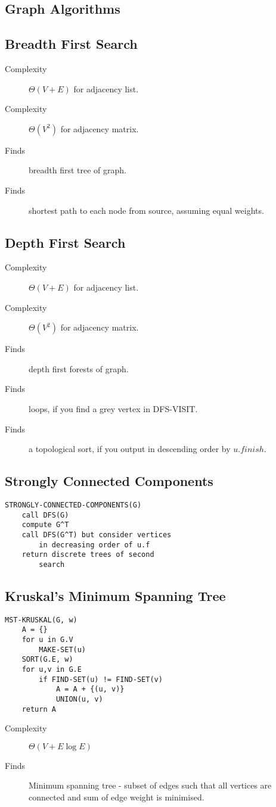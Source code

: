 \documentclass[landscape]{cheat}
\begin{document}
\begin{multicols*}{3}
\section{Graph Algorithms}

\subsection{Breadth First Search}
\begin{description}
    \item[Complexity] $\Theta(V+E)$ for adjacency list.
    \item[Complexity] $\Theta(V^2)$ for adjacency matrix.
    \item[Finds] breadth first tree of graph.
    \item[Finds] shortest path to each node from source, assuming equal weights.
\end{description}

\subsection{Depth First Search}
\begin{description}
    \item[Complexity] $\Theta(V+E)$ for adjacency list.
    \item[Complexity] $\Theta(V^2)$ for adjacency matrix.
    \item[Finds] depth first forests of graph.
    \item[Finds] loops, if you find a grey vertex in DFS-VISIT.
    \item[Finds] a topological sort, if you output in descending order by $u.finish$.
\end{description}

\subsection{Strongly Connected Components}
\begin{lstlisting}
STRONGLY-CONNECTED-COMPONENTS(G)
    call DFS(G)
    compute G^T
    call DFS(G^T) but consider vertices
        in decreasing order of u.f
    return discrete trees of second
        search
\end{lstlisting}

\columnbreak
\subsection{Kruskal's Minimum Spanning Tree}
\begin{lstlisting}
MST-KRUSKAL(G, w)
    A = {}
    for u in G.V
        MAKE-SET(u)
    SORT(G.E, w)
    for u,v in G.E
        if FIND-SET(u) != FIND-SET(v)
            A = A + {(u, v)}
            UNION(u, v)
    return A
\end{lstlisting}
\begin{description}
    \item[Complexity] $\Theta(V+E\log{E})$
    \item[Finds] Minimum spanning tree - subset of edges such that all vertices are connected and sum of edge weight is minimised.
\end{description}


\end{multicols*}
\end{document}
